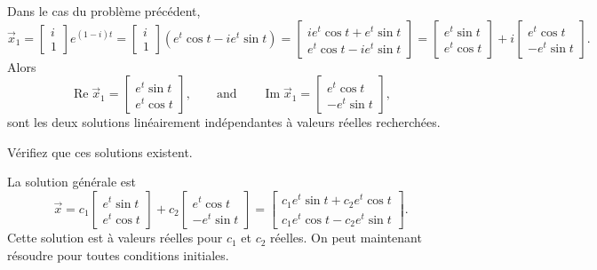 Dans le cas du problème précédent,
\begin{equation*}
\vec{x}_1 =
\begin{bmatrix} i \\ 1 \end{bmatrix} e^{(1-i)t}
=
\begin{bmatrix} i \\ 1 \end{bmatrix} \left( e^t \cos t - i e^t \sin t \right)
=
\begin{bmatrix}
i e^t \cos t + e^t \sin t  \\
e^t \cos t - i e^t \sin t
\end{bmatrix}
=
\begin{bmatrix}
e^t \sin t  \\
e^t \cos t
\end{bmatrix}
+ i
\begin{bmatrix}
e^t \cos t  \\
- e^t \sin t
\end{bmatrix}
.
\end{equation*}
Alors
\begin{equation*}
\operatorname{Re} \vec{x}_1 = 
\begin{bmatrix}
e^t \sin t  \\
e^t \cos t
\end{bmatrix} ,
\qquad \text{and} \qquad
\operatorname{Im} \vec{x}_1 = 
\begin{bmatrix}
e^t \cos t \\
- e^t \sin t
\end{bmatrix} ,
\end{equation*}
sont les deux solutions linéairement indépendantes à valeurs réelles recherchées.

\begin{exercise}
Vérifiez que ces solutions existent.
\end{exercise}

La solution générale est
\begin{equation*}
\vec{x}
=
c_1
\begin{bmatrix}
e^t \sin t  \\
e^t \cos t
\end{bmatrix} 
+ c_2
\begin{bmatrix}
e^t \cos t \\
-e^t \sin t
\end{bmatrix} 
=
\begin{bmatrix}
c_1 e^t \sin t + c_2 e^t \cos t \\
c_1 e^t \cos t - c_2 e^t \sin t
\end{bmatrix} .
\end{equation*}
Cette solution est à valeurs réelles pour $c_1$ et $c_2$ réelles. On peut maintenant résoudre pour toutes conditions initiales.

